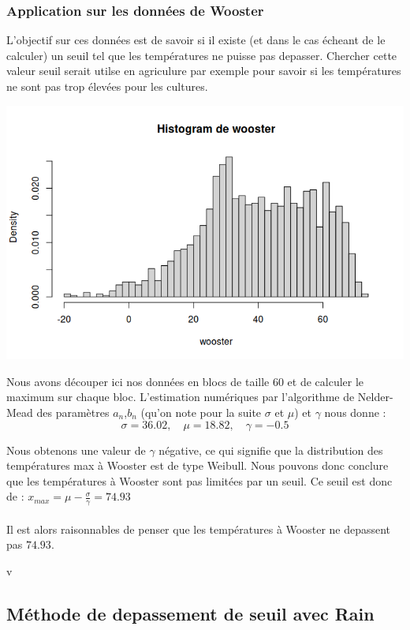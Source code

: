 \documentclass{article}
\begin{document}
\subsubsection{Application sur les données de Wooster}
L'objectif sur ces données est de savoir si il existe (et dans le cas écheant de le calculer) un seuil tel que les températures ne puisse pas depasser.
Chercher cette valeur seuil serait utilse en agriculure par exemple pour savoir si les températures ne sont pas trop élevées pour les cultures.

\begin{center}
	\includegraphics[scale=0.8]{./images/woosterhisto.png} 
\end{center}

Nous avons découper ici nos données en blocs de taille $60$ et de calculer le maximum sur chaque bloc.
L'estimation numériques par l'algorithme de Nelder-Mead des paramètres $a_n$,$b_n$  (qu'on note pour la suite $\sigma$ et $\mu$) et $\gamma$ nous donne :
\[
\sigma = 36.02, \quad \mu= 18.82, \quad \gamma = -0.5
\]

Nous obtenons une valeur de $\gamma$ négative, ce qui signifie que la distribution des températures max à Wooster est de type Weibull.
Nous pouvons donc conclure que les températures à Wooster sont pas limitées par un seuil.
Ce seuil est donc de : $x_{max} = \mu - \frac{\sigma}{\gamma} = 74.93 $
\\
\\
Il est alors raisonnables de penser que les températures à Wooster ne depassent pas $74.93$.

v
\subsection{Méthode de depassement de seuil avec Rain}
\end{document}
